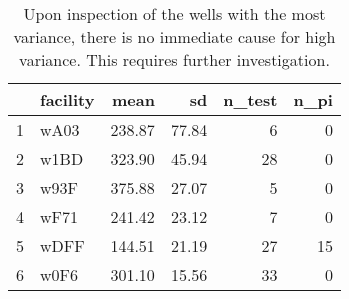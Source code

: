 \begin{table}[h]
\centering
\begin{tabular}{rlrrrr}
  \hline
 & facility & mean & sd & n\_test & n\_pi \\ 
  \hline
1 & wA03 & 238.87 & 77.84 &   6 &   0 \\ 
  2 & w1BD & 323.90 & 45.94 &  28 &   0 \\ 
  3 & w93F & 375.88 & 27.07 &   5 &   0 \\ 
  4 & wF71 & 241.42 & 23.12 &   7 &   0 \\ 
  5 & wDFF & 144.51 & 21.19 &  27 &  15 \\ 
  6 & w0F6 & 301.10 & 15.56 &  33 &   0 \\ 
   \hline
\end{tabular}
\caption{Upon inspection of the wells with the most variance, there is no immediate cause for high variance. This requires further investigation.} 
\label{tab:well_summaries}
\end{table}

